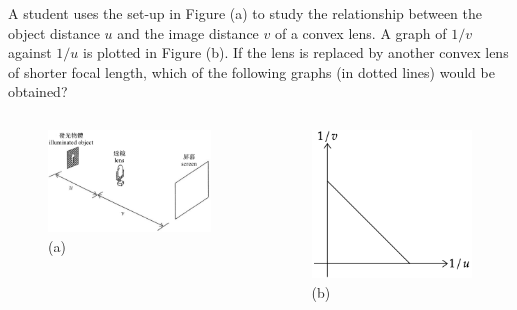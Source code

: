 \documentclass[beamer=true]{standalone}
\begin{document}
\begin{eg}
    A student uses the set-up in Figure (a) to study the relationship between the object distance $u$ and the image distance $v$ of a convex lens. A graph of $1/v$ against $1/u$ is plotted in Figure (b). If the lens is replaced by another convex lens of shorter focal length, which of the following graphs (in dotted lines) would be obtained?
    \begin{columns}
        \begin{figure}
            \centering
            \includegraphics[width=\linewidth]{../../assets/d980un82dun8923d23.png}
            \caption{(a)}
        \end{figure}
        \begin{figure}
            \centering
            \includegraphics[width=\linewidth]{../../assets/dm90j2d3.png}
            \caption{(b)}
        \end{figure}
    \end{columns}
\end{eg}
\end{document}
